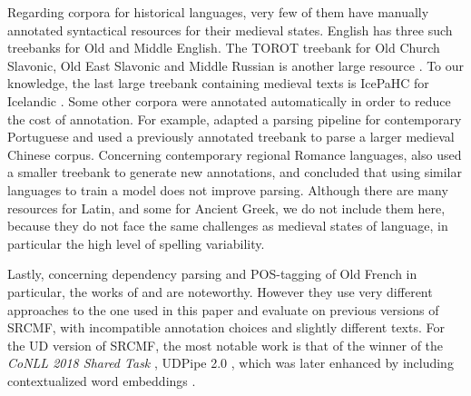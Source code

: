 

Regarding corpora for historical languages, very few of them have manually annotated syntactical resources for their medieval states. English has three such treebanks \citep{20.500.12024/2425,kroch2000ppcme,traugott2008coding} for Old and Middle English. The TOROT treebank for Old Church Slavonic, Old East Slavonic and Middle Russian is another large resource \citep{berdicevskis-eckhoff-2020-diachronic}. To our knowledge, the last large treebank containing medieval texts is IcePaHC for Icelandic \citep{rognvaldsson2012icelandic}. Some other corpora were annotated automatically in order to reduce the cost of annotation. For example, \citet{Rocio} adapted a parsing pipeline for contemporary Portuguese and \citet{lee2016dependency} used a previously annotated treebank \citep{lee2012dependency} to parse a larger medieval Chinese corpus. Concerning contemporary regional Romance languages, \citet{miletic-etal-2020-building} also used a smaller treebank to generate new annotations, and concluded that using similar languages to train a model does not improve parsing. Although there are many resources for Latin, and some for Ancient Greek, we do not include them here, because they do not face the same challenges as medieval states of language, in particular the high level of spelling variability.

Lastly, concerning dependency parsing and POS-tagging of Old French in particular, the works of \citet{guibon2014ParsingPoorlyStandardized} and \citet{stein2014ParsingHeterogeneousCorpora, stein2016OldFrenchDependency} are noteworthy. However they use very different approaches to the one used in this paper and evaluate on previous versions of SRCMF, with incompatible annotation choices and slightly different texts. For the UD version of SRCMF, the most notable work is that of the winner of the \emph{CoNLL 2018 Shared Task} \citep{zeman2018CoNLL2018Shared}, UDPipe 2.0 \citep{straka-2018-udpipe}, which was later enhanced by including contextualized word embeddings \citep{straka2019EvaluatingContextualizedEmbeddings}.

